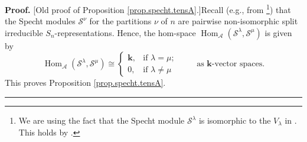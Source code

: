 \documentclass[numbers=enddot,12pt,final,onecolumn,notitlepage]{scrartcl}%
\theoremstyle{definition}
\newenvironment{noncompile}{}{}
\newenvironment{proof}[1][Proof]{\noindent\textbf{#1.} }{\ \rule{0.5em}{0.5em}}
\begin{document}
\begin{noncompile}
\begin{proof}
[Old proof of Proposition \ref{prop.specht.tensA}.]Recall (e.g., from
\cite[Theorem 5.12.2 and Corollary 5.12.4]{Etingof-et-al}\footnote{We are
using the fact that the Specht module $\mathcal{S}^{\lambda}$ is isomorphic to
the $V_{\lambda}$ in \cite{Etingof-et-al}. This holds by \cite[Theorem 5.5.13
\textbf{(b)}]{sga}.}) that the Specht modules $\mathcal{S}^{\nu}$ for the
partitions $\nu$ of $n$ are pairwise non-isomorphic split irreducible $S_{n}%
$-representations. Hence, the hom-space $\operatorname*{Hom}%
\nolimits_{\mathcal{A}}\left(  \mathcal{S}^{\lambda},\mathcal{S}^{\mu}\right)
$ is given by%
\[
\operatorname*{Hom}\nolimits_{\mathcal{A}}\left(  \mathcal{S}^{\lambda
},\mathcal{S}^{\mu}\right)  \cong%
\begin{cases}
\mathbf{k}, & \text{if }\lambda=\mu;\\
0, & \text{if }\lambda\neq\mu
\end{cases}
\ \ \ \ \ \ \ \ \ \ \text{as }\mathbf{k}\text{-vector spaces.}%
\]
This proves Proposition \ref{prop.specht.tensA}.
\end{proof}
\end{noncompile}



\end{document}
